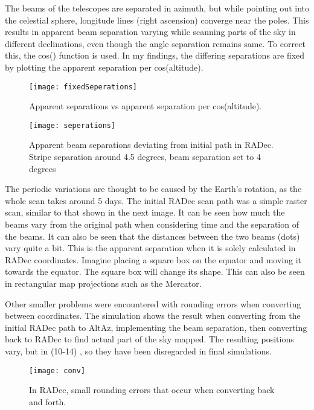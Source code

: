 \documentclass{article}%
\begin{document}
The beams of the telescopes are separated in azimuth, but while pointing out into the celestial sphere, longitude lines (right ascension) converge near the poles. This results in apparent beam separation varying while scanning parts of the sky in different declinations, even though the angle separation remains same. To correct this, the cos() function is used. 
In my findings, the differing separations are fixed by plotting the apparent separation per cos(altitude). 

\begin{figure}[h!]
\texttt{[image: fixedSeperations]}
\caption{Apparent separations vs apparent separation per cos(altitude).}
\end{figure}



\begin{figure}[h!]
\texttt{[image: seperations]}
\caption{Apparent beam separations deviating from initial path in RADec. Stripe separation around 4.5 degrees, beam separation set to 4 degrees}
\end{figure}

The periodic variations are thought to be caused by the Earth's rotation, as the whole scan takes around 5 days. The initial RADec scan path was a simple raster scan, similar to that shown in the next image. It can be seen how much the beams vary from the original path when considering time and the separation of the beams. It can also be seen that the distances between the two beams (dots) vary quite a bit.
\newpage
This is the apparent separation when it is solely calculated in RADec coordinates. Imagine placing a square box on the equator and moving it towards the equator. The square box will change its shape. This can also be seen in rectangular map projections such as the Mercator.

Other smaller problems were encountered with rounding errors when converting between coordinates. The simulation shows the result when converting from the initial RADec path to AltAz, implementing the beam separation, then converting back to RADec to find actual part of the sky mapped. The resulting positions vary, but in (10-14) , so they have been disregarded in final simulations.
 
\begin{figure}[h!]
\begin{center}
\texttt{[image: conv]}
\caption{In RADec, small rounding errors that occur when converting back and forth.}
\end{center}
\end{figure}
\end{document}
